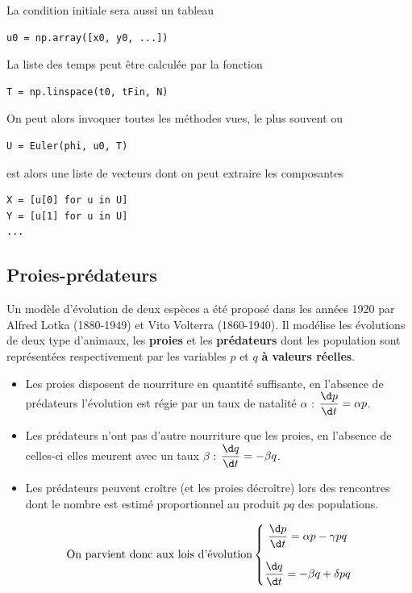 La condition initiale sera aussi un tableau 
\begin{lstlisting}
u0 = np.array([x0, y0, ...])
\end{lstlisting}
La liste des temps peut être calculée par la fonction 
\begin{lstlisting}
T = np.linspace(t0, tFin, N)
\end{lstlisting}
On peut alors invoquer toutes les méthodes vues, le plus souvent  ou 
\begin{lstlisting}
U = Euler(phi, u0, T)
\end{lstlisting}
 est alors une liste de vecteurs dont on peut extraire les composantes
\begin{lstlisting}
X = [u[0] for u in U]
Y = [u[1] for u in U]
...
\end{lstlisting}
\subsection{Proies-prédateurs}
Un modèle d'évolution de deux espèces a été proposé dans les années 1920 par Alfred Lotka (1880-1949) et Vito Volterra (1860-1940). Il modélise les évolutions de deux type d'animaux, les {\bf proies}  et les {\bf prédateurs} dont les population sont représentées respectivement par les variables $p$ et $q$ {\bf à valeurs réelles}.

\begin{itemize}
  \item Les proies disposent de nourriture en quantité suffisante, en l'absence de prédateurs l'évolution est régie par un taux de natalité $\alpha$ : $\displaystyle \frac{\d p}{\d t} = \alpha p$. 
  \item Les prédateurs n'ont pas d'autre nourriture que les proies, en l'absence de celles-ci elles meurent avec un taux $\beta$ : $\displaystyle \frac{\d q}{\d t} = - \beta q$.
\item Les prédateurs peuvent croître (et les proies décroître) lors des rencontres dont le nombre est estimé proportionnel au produit $pq$ des populations. 
\end{itemize}
\[
\text{On parvient donc aux lois d'évolution}
\left\{
\begin{matrix}
\displaystyle \frac{\d p}{\d t} = \alpha p-\gamma pq\\
\\
\displaystyle \frac{\d q}{\d t} = -\beta q + \delta pq
\end{matrix} \right.\]

